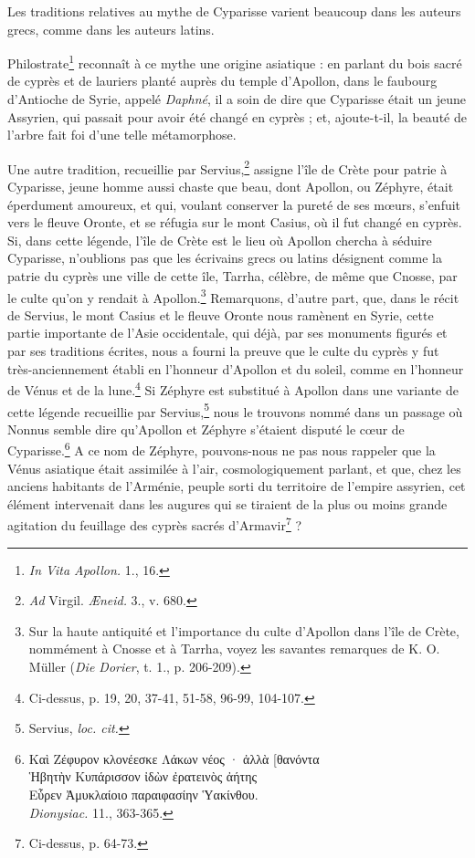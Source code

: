 \documentclass{article}
\begin{document}
Les traditions relatives au mythe de Cyparisse varient beaucoup dans les auteurs grecs, comme dans les auteurs latins.

Philostrate\footnote{\emph{In Vita Apollon.} 1., 16.} reconnaît à ce mythe une origine asiatique : en parlant du bois sacré de cyprès et de lauriers planté auprès du temple d'Apollon, dans le faubourg d'Antioche de Syrie, appelé \emph{Daphné}, il a soin de dire que Cyparisse était un jeune Assyrien, qui passait pour avoir été changé en cyprès ; et, ajoute-t-il, la beauté de l'arbre fait foi d'une telle métamorphose.

Une autre tradition, recueillie par Servius,\footnote{\emph{Ad} Virgil. \emph{Æneid.} 3., v. 680.} assigne l'île de Crète pour patrie à Cyparisse, jeune homme aussi chaste que beau, dont Apollon, ou Zéphyre, était éperdument amoureux, et qui, voulant conserver la pureté de ses mœurs, s'enfuit vers le fleuve Oronte, et se réfugia sur le mont Casius, où il fut changé en cyprès. Si, dans cette légende, l'île de Crète est le lieu où Apollon chercha à séduire Cyparisse, n'oublions pas que les écrivains grecs ou latins désignent comme la patrie du cyprès une ville de cette île, Tarrha, célèbre, de même que Cnosse, par le culte qu'on y rendait à Apollon.\footnote{Sur la haute antiquité et l'importance du culte d'Apollon dans l'île de Crète, nommément à Cnosse et à Tarrha, voyez les savantes remarques de K. O. Müller (\emph{Die Dorier}, t. 1., p. 206-209).} Remarquons, d'autre part, que, dans le récit de Servius, le mont Casius et le fleuve Oronte nous ramènent en Syrie, cette partie importante de l'Asie occidentale, qui déjà, par ses monuments figurés et par ses traditions écrites, nous a fourni la preuve que le culte du cyprès y fut très-anciennement établi en l'honneur d'Apollon et du soleil, comme en l'honneur de Vénus et de la lune.\footnote{Ci-dessus, p. 19, 20, 37-41, 51-58, 96-99, 104-107.} Si Zéphyre est substitué à Apollon dans une variante de cette légende recueillie par Servius,\footnote{Servius, \emph{loc. cit.}} nous le trouvons nommé dans un passage où Nonnus semble dire qu'Apollon et Zéphyre s'étaient disputé le cœur de Cyparisse.\footnote{\textgreek{Καὶ Ζέφυρον κλονέεσκε Λάκων νέος · ἀλλὰ [θανόντα\\\hspace*{5mm}Ἡβητὴν Κυπάρισσον ἰδὼν ἐρατεινὸς ἀήτης\\\hspace*{5mm}Εὗρεν Ἀμυκλαίοιο παραιφασίην Ὑακίνθου}.\\\hspace*{15mm}\emph{Dionysiac.} 11., 363-365.} A ce nom de Zéphyre, pouvons-nous ne pas nous rappeler que la Vénus asiatique était assimilée à l'air, cosmologiquement parlant, et que, chez les anciens habitants de l'Arménie, peuple sorti du territoire de l'empire assyrien, cet élément intervenait dans les augures qui se tiraient de la plus ou moins grande agitation du feuillage des cyprès sacrés d'Armavir\footnote{Ci-dessus, p. 64-73.} ?
\end{document}
